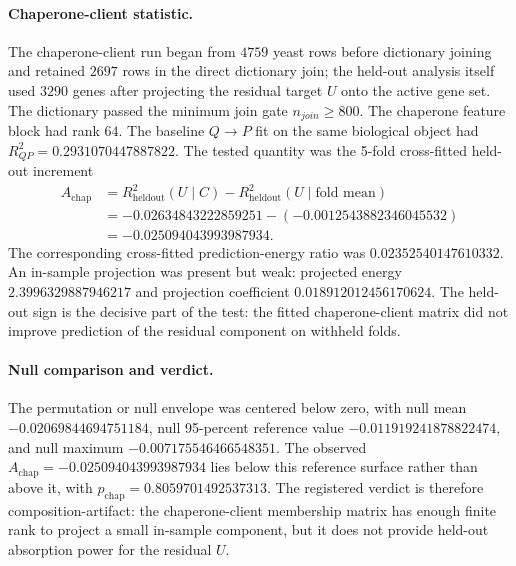 \paragraph{Chaperone-client statistic.}
The chaperone-client run began from $4759$ yeast rows before dictionary joining and retained $2697$ rows in the direct dictionary join; the held-out analysis itself used $3290$ genes after projecting the residual target $U$ onto the active gene set.  The dictionary passed the minimum join gate $n_{join}\geq 800$.  The chaperone feature block had rank $64$.  The baseline $Q \to P$ fit on the same biological object had $R^2_{QP}=0.2931070447887822$.  The tested quantity was the 5-fold cross-fitted held-out increment
$$
\begin{aligned}
A_{\mathrm{chap}}
  &= R^2_{\mathrm{heldout}}(U\mid C)-R^2_{\mathrm{heldout}}(U\mid \text{fold mean}) \\
  &= -0.02634843222859251-(-0.0012543882346045532) \\
  &= -0.025094043993987934 .
\end{aligned}
$$
The corresponding cross-fitted prediction-energy ratio was $0.02352540147610332$.  An in-sample projection was present but weak: projected energy $2.3996329887946217$ and projection coefficient $0.018912012456170624$.  The held-out sign is the decisive part of the test: the fitted chaperone-client matrix did not improve prediction of the residual component on withheld folds.

\paragraph{Null comparison and verdict.}
The permutation or null envelope was centered below zero, with null mean $-0.02069844694751184$, null 95-percent reference value $-0.011919241878822474$, and null maximum $-0.007175546466548351$.  The observed $A_{\mathrm{chap}}=-0.025094043993987934$ lies below this reference surface rather than above it, with $p_{\mathrm{chap}}=0.8059701492537313$.  The registered verdict is therefore composition-artifact: the chaperone-client membership matrix has enough finite rank to project a small in-sample component, but it does not provide held-out absorption power for the residual $U$.

